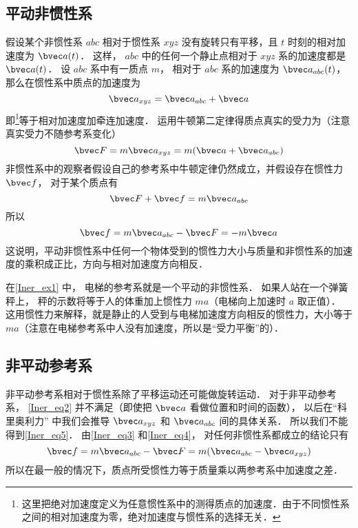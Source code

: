 \subsection{平动非惯性系}
假设某个非惯性系 $abc$ 相对于惯性系 $xyz$ 没有旋转只有平移，且 $t$ 时刻的相对加速度为 $\bvec a(t)$． 这样， $abc$ 中的任何一个静止点相对于 $xyz$ 系的加速度都是 $\bvec a(t)$． 设 $abc$ 系中有一质点 $m$， 相对于 $abc$ 系的加速度为 $\bvec a_{abc} (t)$， 那么在惯性系中质点的加速度为
\begin{equation}\label{Iner_eq2}
\bvec a_{xyz} = \bvec a_{abc} + \bvec a
\end{equation}
即\footnote{这里把绝对加速度定义为任意惯性系中的测得质点的加速度．由于不同惯性系之间的相对加速度为零，绝对加速度与惯性系的选择无关．}等于相对加速度加牵连加速度． 运用牛顿第二定律得质点真实的受力为（注意真实受力不随参考系变化）
\begin{equation}\label{Iner_eq3}
\bvec F = m \bvec a_{xyz} = m(\bvec a + \bvec a_{abc} )
\end{equation}
非惯性系中的观察者假设自己的参考系中牛顿定律仍然成立，并假设存在惯性力 $\bvec f$， 对于某个质点有
\begin{equation}\label{Iner_eq4}
\bvec F + \bvec f = m \bvec a_{abc}
\end{equation}
所以
\begin{equation}\label{Iner_eq5}
\bvec f = m \bvec a_{abc} - \bvec F =  - m\bvec a
\end{equation}
这说明，平动非惯性系中任何一个物体受到的惯性力大小与质量和非惯性系的加速度的乘积成正比，方向与相对加速度方向相反．

在\autoref{Iner_ex1} 中， 电梯的参考系就是一个平动的非惯性系． 如果人站在一个弹簧秤上， 秤的示数将等于人的体重加上惯性力 $ma$（电梯向上加速时 $a$ 取正值）． 这用惯性力来解释，就是静止的人受到与电梯加速度方向相反的惯性力，大小等于 $ma$（注意在电梯参考系中人没有加速度，所以是“受力平衡”的）．

\subsection{非平动参考系}

非平动参考系相对于惯性系除了平移运动还可能做旋转运动． 对于非平动参考系， \autoref{Iner_eq2} 并不满足（即使把 $\bvec a$ 看做位置和时间的函数）， 以后在“科里奥利力” 中我们会推导 $\bvec a_{xyz}$ 和 $\bvec a_{abc}$ 间的具体关系． 所以我们不能得到\autoref{Iner_eq5}． 由\autoref{Iner_eq3} 和\autoref{Iner_eq4}， 对任何非惯性系都成立的结论只有
\begin{equation}
\bvec f = m \bvec a_{abc} - \bvec F =  m( \bvec a_{abc} - \bvec a_{xyz})
\end{equation}
所以在最一般的情况下，质点所受惯性力等于质量乘以两参考系中加速度之差．

